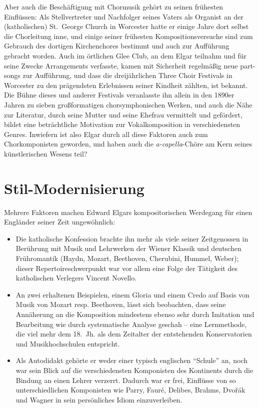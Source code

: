 \documentclass[a4paper,11pt,open=any]{scrbook}
\begin{document}
Aber auch die Beschäftigung mit Chormusik gehört zu seinen frühesten
Einflüssen: Als Stellvertreter und Nachfolger seines Vaters als Organist
an der (katholischen) St.~George Church in Worcester hatte er einige Jahre dort selbst
die Chorleitung inne, und einige seiner frühesten Kompositionsversuche sind
zum Gebrauch des dortigen Kirchenchores bestimmt und auch zur Aufführung
gebracht worden.  Auch im örtlichen Glee Club, an dem Elgar teilnahm und für
seine Zwecke Arrangements verfasste, kamen mit Sicherheit regelmäßig neue
part-songs zur Aufführung, und dass die dreijährlichen Three Choir Festivals
in Worcester zu den prägendsten Erlebnissen seiner Kindheit zählten, ist
bekannt\cite[S.~30f., 43, 57, etc.]{moore}.  Die Bühne dieses und anderer
Festivals veranlasste ihn allein in den 1890er Jahren zu sieben großformatigen
chorsymphonischen Werken, und auch die Nähe zur Literatur, durch seine
Mutter und seine Ehefrau vermittelt und gefördert, bildet eine beträchtliche
Motivation zur Vokalkomposition in verschiedensten Genres.  Inwiefern ist
also Elgar durch all diese Faktoren auch zum Chorkomponisten geworden, und
haben auch die \textit{a-capella}-Chöre am Kern seines künstlerischen Wesens
teil?

\section{Stil-Modernisierung}
Mehrere Faktoren machen Edward Elgars kompositorischen Werdegang für einen
Engländer seiner Zeit ungewöhnlich:

\begin{itemize}
 \item Die katholische Konfession brachte ihn mehr als viele seiner
 Zeitgenossen in Berührung mit Musik und Lehrwerken der Wiener Klassik
 und deutschen Frühromantik (Haydn, Mozart, Beethoven, Cherubini, Hummel,
 Weber); dieser Repertoireschwerpunkt war vor allem eine Folge der Tätigkeit
 des katholischen Verlegers Vincent Novello.

 \item An zwei erhaltenen Beispielen, einem Gloria und einem Credo auf Basis
 von Musik von Mozart resp. Beethoven, lässt sich beobachten, dass seine
 Annäherung an die Komposition mindestens ebenso sehr durch Imitation und
 Bearbeitung wie durch systematische Analyse geschah – eine Lernmethode, die
 viel mehr dem 18.~Jh. als dem Zeitalter der entstehenden Konservatorien und
 Musikhochschulen entspricht.

 \item Als Autodidakt gehörte er weder einer typisch englischen
 \enquote{Schule} an, noch war sein Blick auf die verschiedensten
 Komponisten des Kontinents durch die Bindung an einen Lehrer verzerrt.
 Dadurch war er frei, Einflüsse von so unterschiedlichen Komponisten wie
 Parry, Fauré, Delibes, Brahms, Dvořák und Wagner in sein persönliches
 Idiom einzuverleiben.
\end{itemize}
\end{document}
